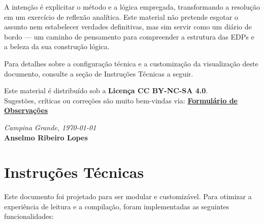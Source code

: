 \documentclass[10pt,a4paper]{article}
\begin{document}
	A intenção é explicitar o método e a lógica empregada, transformando a resolução em um exercício de reflexão analítica. Este material não pretende esgotar o assunto nem estabelecer verdades definitivas, mas sim servir como um diário de bordo --- um caminho de pensamento para compreender a estrutura das EDPs e a beleza da sua construção lógica.
	
	Para detalhes sobre a configuração técnica e a customização da visualização deste documento, consulte a seção de Instruções Técnicas a seguir.
	\begin{center}
		\small
		Este material é distribuído sob a \textbf{Licença CC BY-NC-SA 4.0}. \\
		Sugestões, críticas ou correções são muito bem-vindas via: \href{https://forms.gle/UcBrKWL7YxdXCX7y9}{\textbf{\color{blue!70!black}Formulário de Observações}}
	\end{center}
	\begin{flushright}
		\textit{Campina Grande, \today} \\
		\textbf{Anselmo Ribeiro Lopes}
	\end{flushright}
	
	\newpage
	\section*{Instruções Técnicas}
	
	Este documento foi projetado para ser modular e customizável. Para otimizar a experiência de leitura e a compilação, foram implementadas as seguintes funcionalidades:
	
	\vspace{0.3cm}
	
\end{document}
